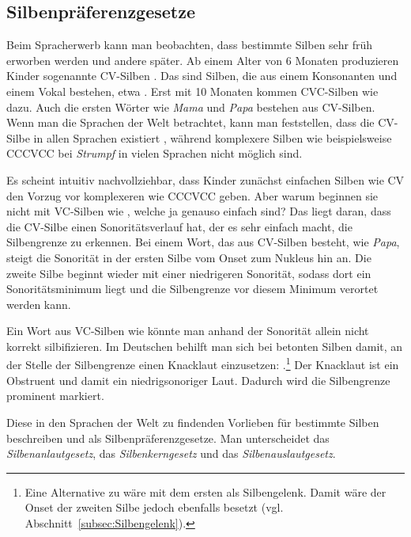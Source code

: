 \subsection{Silbenpräferenzgesetze}\label{subsec:Silbenpräferenz}

Beim Spracherwerb kann man beobachten, dass bestimmte Silben sehr früh erworben werden und andere später. Ab einem Alter von 6 Monaten produzieren Kinder sogenannte CV-Silben \citep[23]{Falk2008}. Das sind Silben, die aus einem Konsonanten und einem Vokal bestehen, etwa \textipa{[ba]}. Erst mit 10 Monaten kommen CVC-Silben wie \textipa{[bab]} dazu. Auch die ersten Wörter wie \textit{Mama} und \textit{Papa} bestehen aus CV-Silben. Wenn man die Sprachen der Welt betrachtet, kann man feststellen, dass die CV-Silbe in allen Sprachen existiert \citep[213]{Hall2000}, während komplexere Silben wie beispielsweise CCCVCC bei \textit{Strumpf} in vielen Sprachen nicht möglich sind.

Es scheint intuitiv nachvollziehbar, dass Kinder zunächst einfachen Silben wie CV den Vorzug vor komplexeren wie CCCVCC geben. Aber warum beginnen sie nicht \zB mit VC-Silben wie \textipa{[ab]}, welche ja genauso einfach sind? Das liegt daran, dass die CV-Silbe einen Sonoritätsverlauf hat, der es sehr einfach macht, die Silbengrenze zu erkennen. Bei einem Wort, das aus CV-Silben besteht, wie \zB \textit{Papa}, steigt die Sonorität in der ersten Silbe vom Onset zum Nukleus hin an. Die zweite Silbe beginnt wieder mit einer niedrigeren Sonorität, sodass dort ein Sonoritätsminimum liegt und die Silbengrenze vor diesem Minimum verortet werden kann.

Ein Wort aus VC-Silben wie \textipa{[am.am]} könnte man anhand der Sonorität allein nicht korrekt silbifizieren. Im Deutschen behilft man sich bei betonten Silben damit, an der Stelle der Silbengrenze einen Knacklaut einzusetzen: .\footnote{Eine Alternative zu  wäre \textipa{[Pa\.*mam]} mit dem ersten  als Silbengelenk. Damit wäre der Onset der zweiten Silbe jedoch ebenfalls besetzt (vgl. Abschnitt~\ref{subsec:Silbengelenk}).} Der Knacklaut ist ein Obstruent und damit ein niedrigsonoriger Laut. Dadurch wird die Silbengrenze prominent markiert.

Diese in den Sprachen der Welt zu findenden Vorlieben für bestimmte Silben beschreiben \citet[212--217]{Hall2000} und \citet[229--230]{Pompino-Marschall2020} als Silbenpräferenzgesetze.
Man unterscheidet das \textit{Silbenanlautgesetz}, das \textit{Silbenkerngesetz} und das \textit{Silbenauslautgesetz}. 

